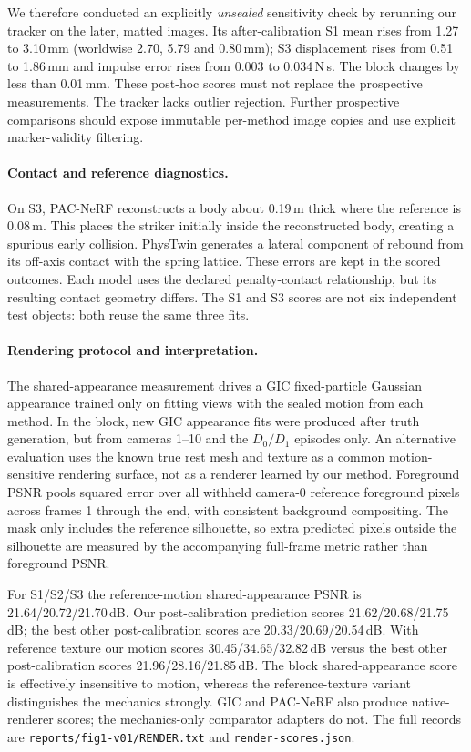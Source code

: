 We therefore conducted an explicitly \emph{unsealed} sensitivity check by rerunning our tracker on the later, matted images. Its after-calibration S1 mean rises from 1.27 to 3.10\,mm (worldwise 2.70, 5.79 and 0.80\,mm); S3 displacement rises from 0.51 to 1.86\,mm and impulse error rises from 0.003 to 0.034\,N\,s. The block changes by less than 0.01\,mm. These post-hoc scores must not replace the prospective measurements. The tracker lacks outlier rejection. Further prospective comparisons should expose immutable per-method image copies and use explicit marker-validity filtering.

\paragraph{Contact and reference diagnostics.}
On S3, PAC-NeRF reconstructs a body about 0.19\,m thick where the reference is 0.08\,m. This places the striker initially inside the reconstructed body, creating a spurious early collision. PhysTwin generates a lateral component of rebound from its off-axis contact with the spring lattice. These errors are kept in the scored outcomes. Each model uses the declared penalty-contact relationship, but its resulting contact geometry differs. The S1 and S3 scores are not six independent test objects: both reuse the same three fits.

\paragraph{Rendering protocol and interpretation.}
The shared-appearance measurement drives a GIC fixed-particle Gaussian appearance trained only on fitting views with the sealed motion from each method. In the block, new GIC appearance fits were produced after truth generation, but from cameras 1--10 and the $D_0/D_1$ episodes only. An alternative evaluation uses the known true rest mesh and texture as a common motion-sensitive rendering surface, not as a renderer learned by our method. Foreground PSNR pools squared error over all withheld camera-0 reference foreground pixels across frames 1 through the end, with consistent background compositing. The mask only includes the reference silhouette, so extra predicted pixels outside the silhouette are measured by the accompanying full-frame metric rather than foreground PSNR.

For S1/S2/S3 the reference-motion shared-appearance PSNR is 21.64/20.72/21.70\,dB. Our post-calibration prediction scores 21.62/20.68/21.75\,dB; the best other post-calibration scores are 20.33/20.69/20.54\,dB. With reference texture our motion scores 30.45/34.65/32.82\,dB versus the best other post-calibration scores 21.96/28.16/21.85\,dB. The block shared-appearance score is effectively insensitive to motion, whereas the reference-texture variant distinguishes the mechanics strongly. GIC and PAC-NeRF also produce native-renderer scores; the mechanics-only comparator adapters do not. The full records are \texttt{reports/fig1-v01/RENDER.txt} and \texttt{render-scores.json}.

